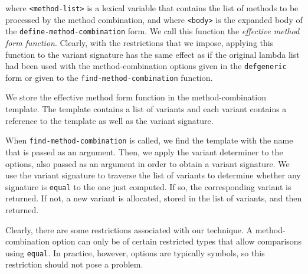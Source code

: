 where \texttt{<method-list>} is a lexical variable that contains the
list of methods to be processed by the method combination, and where
\texttt{<body>} is the expanded body of the
\texttt{define-method-combination} form.  We call this function the
\emph{effective method form function}.  Clearly, with the
restrictions that we impose, applying this function to the variant
signature has the same effect as if the original lambda list had been
used with the method-combination options given in the
\texttt{defgeneric} form or given to the
\texttt{find-method-combination} function.

We store the effective method form function in the method-combination
template.  The template contains a list of variants and each variant
contains a reference to the template as well as the variant signature.

When \texttt{find-method-combination} is called, we find the template
with the name that is passed as an argument.  Then, we apply the
variant determiner to the options, also passed as an argument in order
to obtain a variant signature.  We use the variant signature to
traverse the list of variants to determine whether any signature is
\texttt{equal} to the one just computed.  If so, the corresponding
variant is returned.  If not, a new variant is allocated, stored in
the list of variants, and then returned.

Clearly, there are some restrictions associated with our technique.  A
method-combination option can only be of certain restricted types that
allow comparisons using \texttt{equal}.  In practice, however, options
are typically symbols, so this restriction should not pose a problem.
